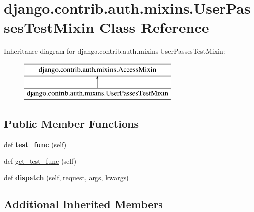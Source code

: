 \hypertarget{classdjango_1_1contrib_1_1auth_1_1mixins_1_1_user_passes_test_mixin}{}\section{django.\+contrib.\+auth.\+mixins.\+User\+Passes\+Test\+Mixin Class Reference}
\label{classdjango_1_1contrib_1_1auth_1_1mixins_1_1_user_passes_test_mixin}
Inheritance diagram for django.\+contrib.\+auth.\+mixins.\+User\+Passes\+Test\+Mixin\+:\begin{figure}[H]
\begin{center}
\leavevmode
\includegraphics[height=2.000000cm]{classdjango_1_1contrib_1_1auth_1_1mixins_1_1_user_passes_test_mixin}
\end{center}
\end{figure}
\subsection*{Public Member Functions}
\begin{DoxyCompactItemize}
\item 
\mbox{\label{classdjango_1_1contrib_1_1auth_1_1mixins_1_1_user_passes_test_mixin_ac74c009b37e4bfc1fd2f0c44abf84cfb}} 
def {\bfseries test\+\_\+func} (self)
\item 
def \mbox{\hyperlink{classdjango_1_1contrib_1_1auth_1_1mixins_1_1_user_passes_test_mixin_af917f3976d6e7c99ad76fed024c98df4}{get\+\_\+test\+\_\+func}} (self)
\item 
\mbox{\label{classdjango_1_1contrib_1_1auth_1_1mixins_1_1_user_passes_test_mixin_aba3301fcd7cd818ae03438d3e85e4149}} 
def {\bfseries dispatch} (self, request, args, kwargs)
\end{DoxyCompactItemize}
\subsection*{Additional Inherited Members}


